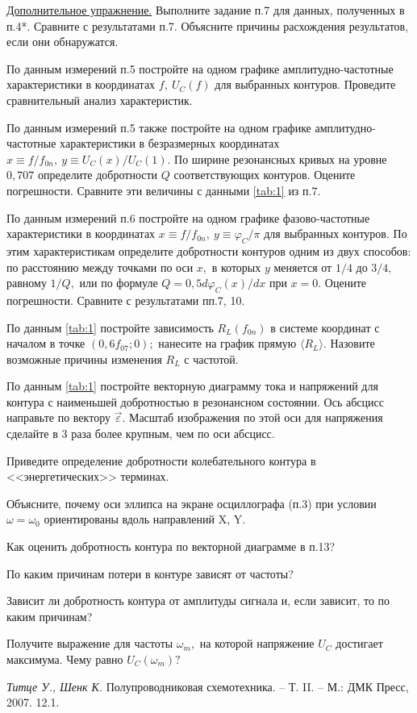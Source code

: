\begin{lab:task}
    \item \underline{Дополнительное упражнение.} Выполните задание п.7 для данных, полученных в п.4*. Сравните с результатами п.7. Объясните причины расхождения результатов, если они обнаружатся.
    \item По данным измерений п.5 постройте на одном графике амплитудно-частотные характе\-ристики в координатах $ f,~U_C(f)$ для выбранных контуров. Проведите сравнительный анализ характеристик.
    \item По данным измерений п.5 также постройте на одном графике амплитудно-частотные характеристики в безразмерных координатах $x\equiv f/f_{0n},~y\equiv U_C(x)/U_C(1).$ По ширине резонансных кривых на уровне $0,707$ определите добротности $Q$ соответствующих контуров. Оцените погрешности. Сравните эти величины с данными \eqref{tab:1} из п.7.
    \item По данным измерений п.6 постройте на одном графике фазово-частотные характеристи\-ки в координатах $x\equiv f/f_{0n},~y\equiv\varphi_C/\pi$ для выбранных контуров. По этим характеристи\-кам определите добротности контуров одним из двух способов: по расстоянию между точками по оси $x,$ в которых $y$ меняется от $1/4$ до $3/4,$ равному $1/Q,$ или по формуле $Q=0,5d\varphi_C(x)/dx$ при $x=0.$ Оцените погрешности. Сравните с результатами пп.7, 10.
    \item По данным \eqref{tab:1} постройте зависимость $R_L(f_{0n})$ в системе координат с началом в точке $(0,6f_{07};0);$ нанесите на график прямую $\langle R_L\rangle.$ Назовите возможные причины изменения $R_L$ с частотой.
    \item По данным \eqref{tab:1} постройте векторную диаграмму тока и напряжений для контура с наименьшей добротностью в резонансном состоянии. Ось абсцисс направьте по вектору $\vec \varepsilon.$ Масштаб изображения по этой оси для напряжения сделайте в 3 раза более крупным, чем по оси абсцисс.

\end{lab:task}



\begin{lab:questions}
	\item Приведите определение добротности колебательного контура в <<энергетических>> терминах.
	
	\item Объясните, почему оси эллипса на экране осциллографа (п.3) при условии $\omega=\omega_0$ ориентированы вдоль направлений X, Y.
	
	\item Как оценить добротность контура по векторной диаграмме в п.13?
	
	\item По каким причинам потери в контуре зависят от частоты?
	
	\item Зависит ли добротность контура от амплитуды сигнала и, если зависит, то по каким причинам?
	
	\item Получите выражение для частоты $\omega_m,$ на которой напряжение $U_C$ достигает максимума. Че\-му равно $U_C(\omega_m)?$
\end{lab:questions}


\begin{lab:literature}
	\item \emph{Титце У., Шенк К.} Полупроводниковая схемотехника.  – Т. II. – М.: ДМК Пресс, 2007. 12.1.
\end{lab:literature}
